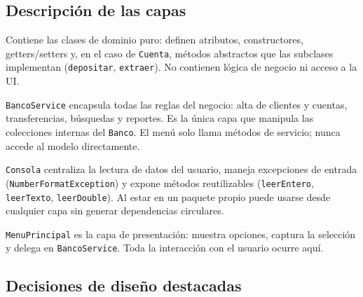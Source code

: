 \documentclass[12pt, a4paper]{article}
\begin{document}
\subsection{Descripción de las capas}

\begin{description}[leftmargin=2cm, style=nextline]
  \item[\texttt{modelos/}]
    Contiene las clases de dominio puro: definen atributos, constructores,
    getters/setters y, en el caso de \texttt{Cuenta}, métodos abstractos que
    las subclases implementan (\texttt{depositar}, \texttt{extraer}).
    No contienen lógica de negocio ni acceso a la UI.

  \item[\texttt{servicio/}]
    \texttt{BancoService} encapsula todas las reglas del negocio: alta de
    clientes y cuentas, transferencias, búsquedas y reportes.
    Es la única capa que manipula las colecciones internas del \texttt{Banco}.
    El menú solo llama métodos de servicio; nunca accede al modelo directamente.

  \item[\texttt{utilidades/}]
    \texttt{Consola} centraliza la lectura de datos del usuario, maneja excepciones de entrada (\texttt{NumberFormatException}) y expone métodos
    reutilizables (\texttt{leerEntero}, \texttt{leerTexto}, \texttt{leerDouble}).
    Al estar en un paquete propio puede usarse desde cualquier capa sin generar
    dependencias circulares.

  \item[\texttt{menu/}]
    \texttt{MenuPrincipal} es la capa de presentación: muestra opciones,
    captura la selección y delega en \texttt{BancoService}. Toda la interacción
    con el usuario ocurre aquí.
\end{description}

\subsection{Decisiones de diseño destacadas}
\end{document}
